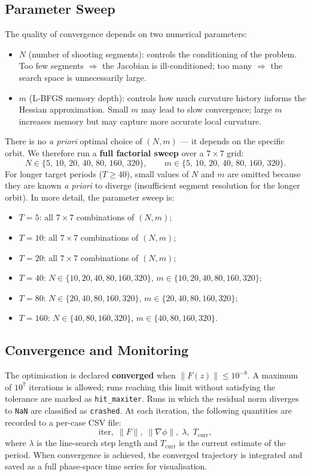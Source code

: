 \documentclass[11pt,a4paper]{article}
\begin{document}
\subsection{Parameter Sweep}
The quality of convergence depends on two numerical parameters:
\begin{itemize}
  \item \textbf{$N$} (number of shooting segments): controls the
        conditioning of the problem.  Too few segments $\Rightarrow$ the
        Jacobian is ill-conditioned; too many $\Rightarrow$ the search space
        is unnecessarily large.
  \item \textbf{$m$} (L-BFGS memory depth): controls how much curvature
        history informs the Hessian approximation.  Small $m$ may lead to
        slow convergence; large $m$ increases memory but may capture more
        accurate local curvature.
\end{itemize}
There is no \textit{a priori} optimal choice of $(N, m)$ --- it depends on
the specific orbit.  We therefore run a \textbf{full factorial sweep} over a
$7 \times 7$ grid:
\begin{equation}\label{eq:param_grid}
  N \in \{5,\,10,\,20,\,40,\,80,\,160,\,320\},
  \qquad
  m \in \{5,\,10,\,20,\,40,\,80,\,160,\,320\}.
\end{equation}
For longer target periods ($T \ge 40$), small values of $N$ and $m$ are
omitted because they are known \textit{a priori} to diverge (insufficient
segment resolution for the longer orbit). In more detail, the parameter sweep is:
\begin{itemize}
  \item $T = 5$: all $7 \times 7$ combinations of $(N, m)$;
  \item $T = 10$: all $7 \times 7$ combinations of $(N, m)$;
  \item $T = 20$: all $7 \times 7$ combinations of $(N, m)$;
  \item $T = 40$: $N \in \{10, 20, 40, 80, 160, 320\}$, $m \in \{10, 20, 40, 80, 160, 320\}$;
  \item $T = 80$: $N \in \{20, 40, 80, 160, 320\}$, $m \in \{20, 40, 80, 160, 320\}$;
  \item $T = 160$: $N \in \{40, 80, 160, 320  \}$, $m \in \{40, 80, 160, 320\}$.
\end{itemize}

\subsection{Convergence and Monitoring}
The optimisation is declared \textbf{converged} when
$\|F(z)\| \le 10^{-8}$.  A maximum of $10^7$ iterations
is allowed; runs reaching this limit without satisfying the tolerance are
marked as \texttt{hit\_maxiter}.  Runs in which the residual norm diverges
to \texttt{NaN} are classified as \texttt{crashed}.  At each iteration, the
following quantities are recorded to a per-case CSV file:
\[
  \text{iter},\; \|F\|,\; \|\nabla\phi\|,\; \lambda,\; T_{\text{curr}},
\]
where $\lambda$ is the line-search step length and $T_{\text{curr}}$ is the
current estimate of the period.  When convergence is achieved, the converged
trajectory is integrated and saved as a full phase-space time series for
visualisation.
\end{document}
